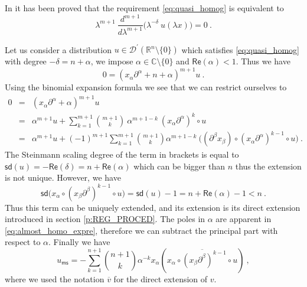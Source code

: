 \documentclass[11pt]{book}
\newcommand{\ms}{\mathsf{ms}}
\newcommand{\sd}{\mathsf{sd}}
\renewcommand{\Re}{\mathsf{Re}}
\newcommand{\Dcal}{\mathcal{D}}
\newcommand{\Cbb}{\mathbb{C}}
\newcommand{\Rbb}{\mathbb{R}}
\theoremstyle{break}
\begin{document}
In \cite{DF_2004} it has been proved that the requirement \eqref{eq:quasi_homog} is equivalent to 
%
\begin{equation}
\lambda^{m+1} \ \dfrac{d^{m+1}}{d\lambda^{m+1}} \bigg( \lambda^{-\delta}  \ u(\lambda x ) \bigg) = 0 \ .
\label{eq:quasi_euler_numeric}
\end{equation}


Let us consider a distribution $u \in \Dcal^\prime(\Rbb^n\setminus\{0\})$ which satisfies \eqref{eq:quasi_homog} with degree $-\delta = n + \alpha$, we impose $\alpha\in\Cbb\setminus\{0\}$ and $\Re(\alpha)<1$. Thus we have
%
\begin{equation*}
0 = \left( x_\alpha \partial^\alpha + n + \alpha \right)^{m+1} u \ .
\end{equation*}
%
Using the binomial expansion formula we see that we can restrict ourselves to 
%
\begin{eqnarray}
0 &=&\left(x_\alpha \partial^\alpha + \alpha \right)^{m+1} u \nonumber \\
&=& \alpha^{m+1} u + \sum_{k=1}^{m+1} \binom{m+1}{k} \ \alpha^{m+1-k} \ \left(x_\alpha \partial^\alpha \right)^{k} \circ u \nonumber \\
&=& \alpha^{m+1} u + (-1)^{m+1} \sum_{k=1}^{m+1} \binom{m+1}{k} \alpha^{m+1-k} \ \bigg( \left(\partial^\beta x_\beta \right) \circ \left(x_\alpha \partial^\alpha \right)^{k-1} \circ u \bigg) \ .
\label{eq:almost_homo_expre}
\end{eqnarray}
%
The Steinmann scaling degree of the term in brackets is equal to $\sd(u) = - \Re(\delta)=n+\Re(\alpha)$ which can be bigger than $n$ thus the extension is not unique. However, we have
%
\begin{equation*}
\sd\bigg(x_\alpha \circ \left(x_\beta \partial^\beta \right)^{k-1} \circ u\bigg) = \sd(u) - 1 = n + \Re(\alpha) - 1 < n \ .
\end{equation*}
%
Thus this term can be uniquely extended, and its extension is its direct extension introduced in section \ref{p:REG_PROCED}. The poles in $\alpha$ are apparent in \eqref{eq:almost_homo_expre}, therefore we can subtract the principal part with respect to $\alpha$. Finally we have
%
\begin{equation*}
u_\ms = - \sum_{k=1}^{n+1} \binom{n+1}{k} \alpha^{-k} x_\alpha \left( \overline{ x_\alpha \circ \left(x_\beta \partial^\beta \right)^{k-1} \circ u } \right) \ , 
\end{equation*}
%
where we used the notation $\overline{v}$ for the direct extension of $v$.
\end{document}

